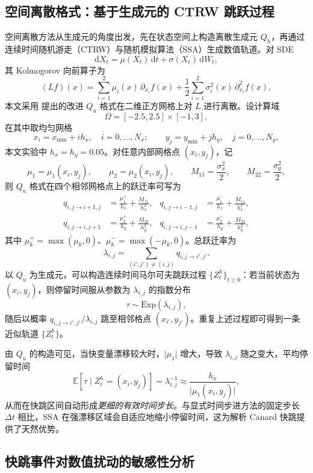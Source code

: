 \subsection{空间离散格式：基于生成元的 CTRW 跳跃过程}

空间离散方法从生成元的角度出发，先在状态空间上构造离散生成元 \(Q_h\)，再通过连续时间随机游走（CTRW）与随机模拟算法（SSA）生成数值轨道。对 SDE
\[
\mathrm{d}X_t = \mu(X_t)\,\mathrm{d}t + \sigma(X_t)\,\mathrm{d}W_t,
\]
其 Kolmogorov 向前算子为
\[
(Lf)(x) = \sum_{i=1}^2 \mu_i(x)\,\partial_{x_i}f(x)
+ \frac12\sum_{i=1}^2\sigma_i^2(x)\,\partial_{x_i}^2 f(x),
\]
本文采用 \cite{zu2023random} 提出的改进 \(Q_u\) 格式在二维正方网格上对 \(L\) 进行离散。设计算域
\[
\Omega = [-2.5,2.5]\times[-1,3],
\]
在其中取均匀网格
\[
x_i = x_{\min} + i h_x,\quad i=0,\dots,N_x;\qquad
y_j = y_{\min} + j h_y,\quad j=0,\dots,N_y,
\]
本文实验中 \(h_x=h_y=0.05\)。对任意内部网格点 \((x_i,y_j)\)，记
\[
\mu_1 = \mu_1(x_i,y_j),\qquad
\mu_2 = \mu_2(x_i,y_j),\qquad
M_{11} = \frac{\sigma_x^2}{2},\qquad
M_{22} = \frac{\sigma_y^2}{2},
\]
则 \(Q_u\) 格式在四个相邻网格点上的跃迁率可写为
\begin{align*}
	q_{i,j\to i+1,j}
	&= \frac{\mu_1^+}{h_x} + \frac{M_{11}}{h_x^2},&
	q_{i,j\to i-1,j}
	&= \frac{\mu_1^-}{h_x} + \frac{M_{11}}{h_x^2},\\[2pt]
	q_{i,j\to i,j+1}
	&= \frac{\mu_2^+}{h_y} + \frac{M_{22}}{h_y^2},&
	q_{i,j\to i,j-1}
	&= \frac{\mu_2^-}{h_y} + \frac{M_{22}}{h_y^2},
\end{align*}
其中 \(\mu_k^+ = \max(\mu_k,0)\)、\(\mu_k^- = \max(-\mu_k,0)\)。总跃迁率为
\[
\lambda_{i,j} = \sum_{(i',j')\neq(i,j)} q_{i,j\to i',j'}.
\]
以 \(Q_u\) 为生成元，可以构造连续时间马尔可夫跳跃过程 \(\{Z_t^h\}_{t\ge0}\)：若当前状态为 \((x_i,y_j)\)，则停留时间服从参数为 \(\lambda_{i,j}\) 的指数分布
\[
\tau\sim\mathrm{Exp}(\lambda_{i,j}),
\]
随后以概率 \(q_{i,j\to i',j'}/\lambda_{i,j}\) 跳至相邻格点 \((x_{i'},y_{j'})\)。重复上述过程即可得到一条近似轨道 \(\{Z_t^h\}\)。

由 \(Q_u\) 的构造可见，当快变量漂移较大时，\(\lvert\mu_1\rvert\) 增大，导致 \(\lambda_{i,j}\) 随之变大，平均停留时间
\[
\mathbb{E}[\tau\mid Z_t^h=(x_i,y_j)]
= \lambda_{i,j}^{-1}
\approx \frac{h_x}{\lvert\mu_1(x_i,y_j)\rvert},
\]
从而在快跳区间自动形成\emph{更细的有效时间步长}。与显式时间步进方法的固定步长 \(\Delta t\) 相比，SSA 在强漂移区域会自适应地缩小停留时间，这为解析 Canard 快跳提供了天然优势。

\subsection{快跳事件对数值扰动的敏感性分析}

